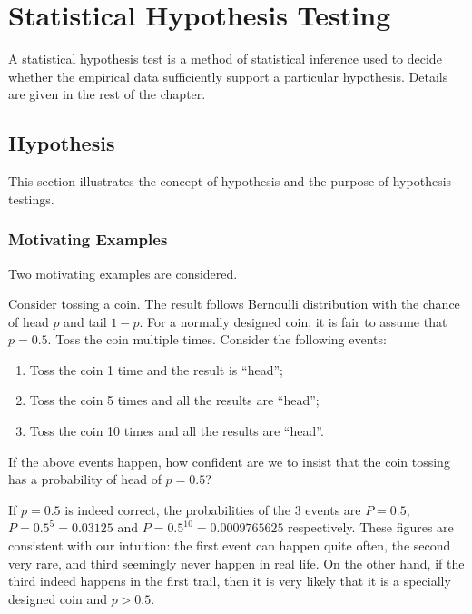 \chapter{Statistical Hypothesis Testing} \label{ch:ht}

A statistical hypothesis test is a method of statistical inference used to decide whether the empirical data sufficiently support a particular hypothesis. Details are given in the rest of the chapter.

\section{Hypothesis}

This section illustrates the concept of hypothesis and the purpose of hypothesis testings.

\subsection{Motivating Examples}

Two motivating examples are considered.

\begin{shortbox}

Consider tossing a coin. The result follows Bernoulli distribution with the chance of head $p$ and tail $1-p$. For a normally designed coin, it is fair to assume that $p=0.5$. Toss the coin multiple times. Consider the following events:
\begin{enumerate}
	\item Toss the coin 1 time and the result is ``head'';
	\item Toss the coin 5 times and all the results are ``head'';
	\item Toss the coin 10 times and all the results are ``head''.
\end{enumerate}

If the above events happen, how confident are we to insist that the coin tossing has a probability of head of $p=0.5$?

\end{shortbox}

If $p=0.5$ is indeed correct, the probabilities of the 3 events are $P=0.5$, $P=0.5^5=0.03125$ and $P=0.5^{10}= 0.0009765625$ respectively. These figures are consistent with our intuition: the first event can happen quite often, the second very rare, and third seemingly never happen in real life. On the other hand, if the third indeed happens in the first trail, then it is very likely that it is a specially designed coin and $p>0.5$.

